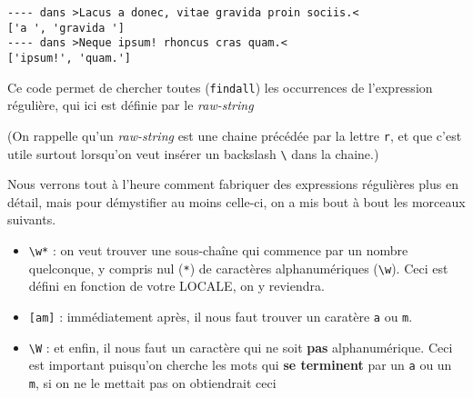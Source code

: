     \begin{Verbatim}[commandchars=\\\{\},frame=single,framerule=0.3mm,rulecolor=\color{cellframecolor}]
---- dans >Lacus a donec, vitae gravida proin sociis.<
['a ', 'gravida ']
---- dans >Neque ipsum! rhoncus cras quam.<
['ipsum!', 'quam.']
\end{Verbatim}

    Ce code permet de chercher toutes (\texttt{findall}) les occurrences de
l'expression régulière, qui ici est définie par le \emph{raw-string}

\begin{Shaded}
\begin{Highlighting}[frame=lines,framerule=0.6mm,rulecolor=\color{asisframecolor}]
\end{Highlighting}
\end{Shaded}

(On rappelle qu'un \emph{raw-string} est une chaine précédée par la
lettre \texttt{r}, et que c'est utile surtout lorsqu'on veut insérer un
backslash \texttt{\textbackslash{}} dans la chaine.)

Nous verrons tout à l'heure comment fabriquer des expressions régulières
plus en détail, mais pour démystifier au moins celle-ci, on a mis bout à
bout les morceaux suivants.

\begin{itemize}
\tightlist
\item
  \texttt{\textbackslash{}w*} : on veut trouver une sous-chaîne qui
  commence par un nombre quelconque, y compris nul (\texttt{*}) de
  caractères alphanumériques (\texttt{\textbackslash{}w}). Ceci est
  défini en fonction de votre LOCALE, on y reviendra.
\item
  \texttt{{[}am{]}} : immédiatement après, il nous faut trouver un
  caratère \texttt{a} ou \texttt{m}.
\item
  \texttt{\textbackslash{}W} : et enfin, il nous faut un caractère qui
  ne soit \textbf{pas} alphanumérique. Ceci est important puisqu'on
  cherche les mots qui \textbf{se terminent} par un \texttt{a} ou un
  \texttt{m}, si on ne le mettait pas on obtiendrait ceci
\end{itemize}

